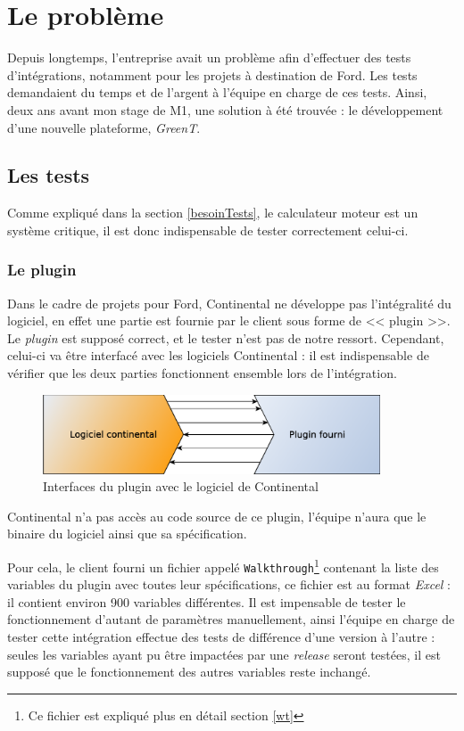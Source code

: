 \chapter{Le problème} \label{chapPb}
\putminitoc
Depuis longtemps, l'entreprise avait un problème afin d'effectuer des tests d'intégrations, notamment pour les projets à destination de Ford. Les tests demandaient du temps et de l'argent à l'équipe en charge de ces tests. Ainsi, deux ans avant mon stage de M1, une solution à été trouvée : le développement d'une nouvelle plateforme, \textit{GreenT}.

\vspace{-32px}
	\section{Les tests} \label{pbTests}
	Comme expliqué dans la section \ref{besoinTests}, le calculateur moteur est un système critique, il est donc indispensable de tester correctement celui-ci.

	\subsection{Le plugin}
	Dans le cadre de projets pour Ford, Continental ne développe pas l'intégralité du logiciel, en effet une partie est fournie par le client sous forme de << plugin >>. Le \textit{plugin} est supposé correct, et le tester n'est pas de notre ressort. Cependant, celui-ci va être interfacé avec les logiciels Continental : il est indispensable de vérifier que les deux parties fonctionnent ensemble lors de l'intégration.
	\begin{figure}[H]
		\centering
		\includegraphics[width=10cm]{contents/images/plugin.eps}
		\caption{Interfaces du plugin avec le logiciel de Continental}
		\label{fig:plugin}	
	\end{figure}
	
	\begin{exemple}
		Continental n'a pas accès au code source de ce plugin, l'équipe n'aura que le binaire du logiciel ainsi que sa spécification.	
	\end{exemple}
	
	Pour cela, le client fourni un fichier appelé \texttt{Walkthrough}\footnote{Ce fichier est expliqué plus en détail section \ref{wt}}
	contenant la liste des variables du plugin avec toutes leur spécifications, ce fichier est au format \textit{Excel} : il contient
	environ 900 variables différentes. Il est impensable de tester le fonctionnement d'autant de paramètres manuellement, ainsi l'équipe en
	charge de tester cette intégration effectue des tests de différence d'une version à l'autre : seules les variables ayant pu être
	impactées par une \textit{release} seront testées, il est supposé que le fonctionnement des autres variables reste inchangé.


